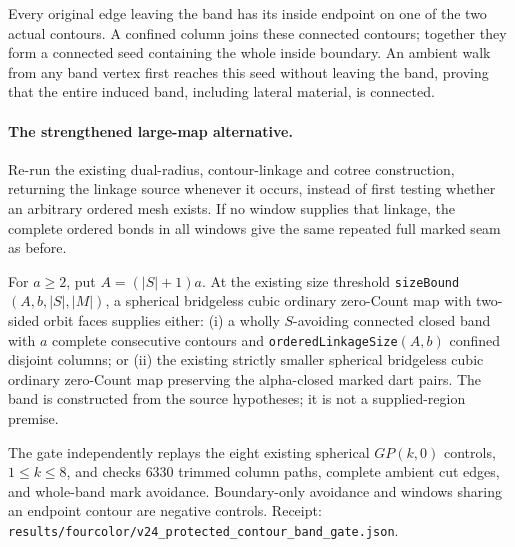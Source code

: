 Every original edge leaving the band has its inside endpoint on one of
the two actual contours. A confined column joins these connected
contours; together they form a connected seed containing the whole
inside boundary. An ambient walk from any band vertex first reaches
this seed without leaving the band, proving that the entire induced
band, including lateral material, is connected.

\paragraph{The strengthened large-map alternative.}
Re-run the existing dual-radius, contour-linkage and cotree construction,
returning the linkage source whenever it occurs, instead of first
testing whether an arbitrary ordered mesh exists. If no window supplies
that linkage, the complete ordered bonds in all windows give the same
repeated full marked seam as before.

For $a\geq2$, put $A=(|S|+1)a$. At the existing size threshold
\texttt{sizeBound}$(A,b,|S|,|M|)$, a spherical bridgeless cubic
ordinary zero-Count map with two-sided orbit faces supplies either:
(i) a wholly $S$-avoiding connected closed band with $a$ complete
consecutive contours and \texttt{orderedLinkageSize}$(A,b)$ confined
disjoint columns; or (ii) the existing strictly smaller spherical
bridgeless cubic ordinary zero-Count map preserving the alpha-closed
marked dart pairs. The band is constructed from the source hypotheses;
it is not a supplied-region premise.

The gate independently replays the eight existing spherical
$GP(k,0)$ controls, $1\leq k\leq8$, and checks $6330$ trimmed column
paths, complete ambient cut edges, and whole-band mark avoidance.
Boundary-only avoidance and windows sharing an endpoint contour are
negative controls. Receipt:
\texttt{results/fourcolor/v24\_protected\_contour\_band\_gate.json}.


